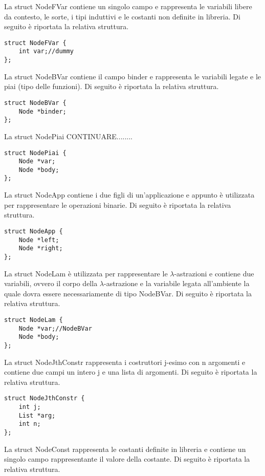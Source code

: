 \documentclass[12pt,a4paper,openright,twoside]{report}
\begin{document}
La struct NodeFVar contiene un singolo campo e rappresenta le variabili libere da contesto, le sorte, i tipi induttivi e le costanti non definite in libreria. Di seguito \`e riportata la relativa struttura.

\begin{verbatim}
struct NodeFVar {
    int var;//dummy
};
\end{verbatim}

La struct NodeBVar contiene il campo binder e rappresenta le variabili legate e le piai (tipo delle funzioni). Di seguito \`e riportata la relativa struttura.

\begin{verbatim}
struct NodeBVar {
    Node *binder;
};
\end{verbatim}

La struct NodePiai CONTINUARE........

\begin{verbatim}
struct NodePiai {
    Node *var;
    Node *body;
};
\end{verbatim}

La struct NodeApp contiene i due figli di un'applicazione e appunto \`e utilizzata per rappresentare le operazioni binarie. Di seguito \`e riportata la relativa struttura.

\begin{verbatim}
struct NodeApp {
    Node *left;
    Node *right;
};
\end{verbatim}

La struct NodeLam \`e utilizzata per rappresentare le $\lambda$-astrazioni e contiene due variabili, ovvero il corpo della $\lambda$-astrazione e la variabile legata all'ambiente la quale dovra essere necessariamente di tipo NodeBVar. Di seguito \`e riportata la relativa struttura.

\begin{verbatim}
struct NodeLam {
    Node *var;//NodeBVar
    Node *body;
};
\end{verbatim}

La struct NodeJthConstr rappresenta i costruttori j-esimo con n argomenti e contiene due campi un intero j e una lista di argomenti. Di seguito \`e riportata la relativa struttura.

\begin{verbatim}
struct NodeJthConstr {
    int j;
    List *arg;
    int n;
};
\end{verbatim}

La struct NodeConst rappresenta le costanti definite in libreria e contiene un singolo campo rappresentante il valore della costante. Di seguito \`e riportata la relativa struttura. 
\end{document}
